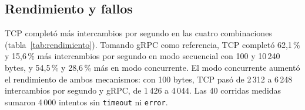 \subsection{Rendimiento y fallos}

TCP completó más intercambios por segundo en las cuatro combinaciones
(tabla~\ref{tab:rendimiento}). Tomando gRPC como referencia, TCP completó 62,1\,\% y 15,6\,\% más
intercambios por segundo en modo secuencial con 100 y 10\,240 bytes, y 54,5\,\% y
28,6\,\% más en modo concurrente.
El modo concurrente aumentó el rendimiento de ambos mecanismos: con 100 bytes,
TCP pasó de 2\,312 a 6\,248 intercambios por segundo y gRPC, de 1\,426 a 4\,044.
Las 40 corridas medidas sumaron 4\,000 intentos sin \texttt{timeout} ni
\texttt{error}.